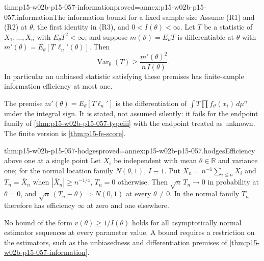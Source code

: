 \begin{hbtheorem}{thm:p15-w02b-p15-057-information}{proved=annex:p15-w02b-p15-057.information}{The information bound for a fixed sample size}
Assume (R1) and (R2) at \(\theta\), the first identity in (R3), and
\(0<I(\theta)<\infty\). Let \(T\) be a statistic of
\(X_1,\ldots,X_n\) with \(E_\theta T^2<\infty\), and suppose
\(m(\vartheta)=E_\vartheta T\) is differentiable at \(\theta\) with
\(m'(\theta)=E_\theta[T\,\ell_n'(\theta)]\). Then
\[
 \operatorname{Var}_\theta(T)\geq\frac{m'(\theta)^2}{n\,I(\theta)}.
\]
In particular an unbiased statistic satisfying these premises has
finite-sample information efficiency at most one.
\end{hbtheorem}

The premise \(m'(\theta)=E_\theta[T\ell_n']\) is the differentiation of
\(\int T\prod f_\vartheta(x_i)\,d\mu^n\) under the integral sign. It is
stated, not assumed silently: it fails for the endpoint family of
\cref{thm:p15-w02b-p15-057-typeiii} with the endpoint treated as unknown.
The finite version is \cref{thm:p15-fe-score}.

\begin{hbtheorem}{thm:p15-w02b-p15-057-hodges}{proved=annex:p15-w02b-p15-057.hodges}{Efficiency above one at a single point}
Let \(X_i\) be independent with mean \(\theta\in\mathbb R\) and variance
one; for the normal location family \(N(\theta,1)\), \(I\equiv1\). Put
\(\overline X_n=n^{-1}\sum_{i\leq n}X_i\) and
\(T_n=\overline X_n\) when \(|\overline X_n|\geq n^{-1/4}\), \(T_n=0\)
otherwise. Then \(\sqrt n\,T_n\to0\) in probability at \(\theta=0\), and
\(\sqrt n\,(T_n-\theta)\Rightarrow N(0,1)\) at every \(\theta\neq0\).
In the normal family \(T_n\) therefore has efficiency \(\infty\) at zero
and one elsewhere.
\end{hbtheorem}

No bound of the form \(v(\theta)\geq1/I(\theta)\) holds for all
asymptotically normal estimator sequences at every parameter value. A bound
requires a restriction on the estimators, such as the unbiasedness and
differentiation premises of \cref{thm:p15-w02b-p15-057-information}.

